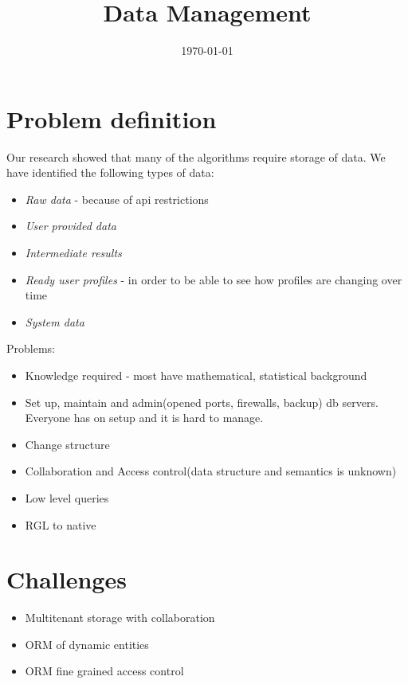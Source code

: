 \documentclass[a4paper, notitlepage]{article}
\begin{document}
\title{Data Management} 
\date{\today}
\maketitle


\section{Problem definition}

Our research showed that many of the algorithms require storage of data. We have identified the following types of data:

\begin{itemize}
	\item \textit{Raw data} - because of api restrictions
	\item \textit{User provided data}
	\item \textit{Intermediate results}
	\item \textit{Ready user profiles} - in order to be able to see how profiles are changing over time
	\item \textit{System data}
\end{itemize}

Problems:

\begin{itemize}
	\item Knowledge required - most have mathematical, statistical background
	\item Set up, maintain and admin(opened ports, firewalls, backup) db servers. Everyone has on setup and it is hard to manage.
	\item Change structure
	\item Collaboration and Access control(data structure and semantics is unknown)
	\item Low level queries
	\item RGL to native
\end{itemize}


\section{Challenges}

\begin{itemize}
	\item Multitenant storage with collaboration
	\item ORM of dynamic entities
	\item ORM fine grained access control
\end{itemize}
\end{document}
